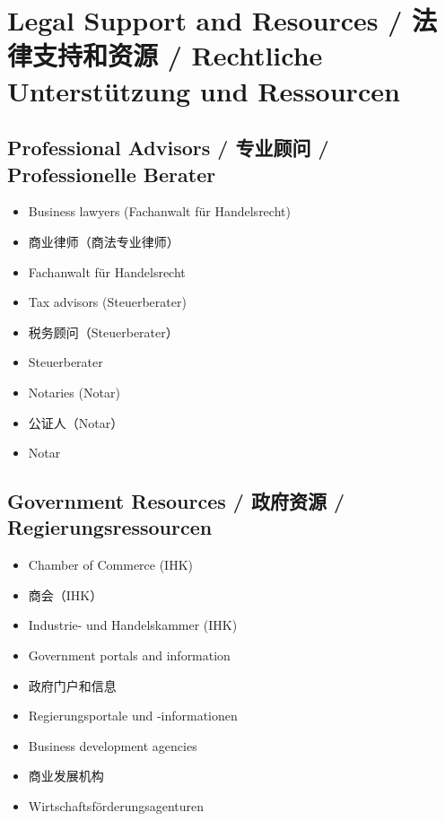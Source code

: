 \section{Legal Support and Resources / 法律支持和资源 / Rechtliche Unterstützung und Ressourcen}

\subsection{Professional Advisors / 专业顾问 / Professionelle Berater}
\begin{itemize}
    \item Business lawyers (Fachanwalt für Handelsrecht)
    \item 商业律师（商法专业律师）
    \item Fachanwalt für Handelsrecht
    \item Tax advisors (Steuerberater)
    \item 税务顾问（Steuerberater）
    \item Steuerberater
    \item Notaries (Notar)
    \item 公证人（Notar）
    \item Notar
\end{itemize}

\subsection{Government Resources / 政府资源 / Regierungsressourcen}
\begin{itemize}
    \item Chamber of Commerce (IHK)
    \item 商会（IHK）
    \item Industrie- und Handelskammer (IHK)
    \item Government portals and information
    \item 政府门户和信息
    \item Regierungsportale und -informationen
    \item Business development agencies
    \item 商业发展机构
    \item Wirtschaftsförderungsagenturen
\end{itemize}
